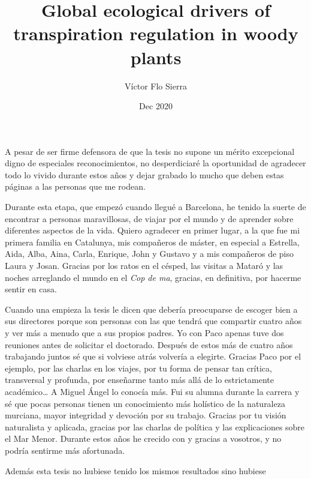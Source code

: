 \documentclass[11pt,twoside]{reedthesis}
\title{Global ecological drivers of transpiration regulation in woody plants}
\author{Víctor Flo Sierra}
\date{Dec 2020}
\begin{document}
  \maketitle

\frontmatter %
\pagestyle{empty} %
  \begin{acknowledgements}
    \setlength{\parindent}{30pt} A pesar de ser firme defensora de que la
    tesis no supone un mérito excepcional digno de especiales
    reconocimientos, no desperdiciaré la oportunidad de agradecer todo lo
    vivido durante estos años y dejar grabado lo mucho que deben estas
    páginas a las personas que me rodean.\par
    Durante esta etapa, que empezó cuando llegué a Barcelona, he tenido la
    suerte de encontrar a personas maravillosas, de viajar por el mundo y de
    aprender sobre diferentes aspectos de la vida. Quiero agradecer en
    primer lugar, a la que fue mi primera familia en Catalunya, mis
    compañeros de máster, en especial a Estrella, Aida, Alba, Aina, Carla,
    Enrique, John y Gustavo y a mis compañeros de piso Laura y Josan.
    Gracias por los ratos en el césped, las visitas a Mataró y las noches
    arreglando el mundo en el \emph{Cop de ma}, gracias, en definitiva, por
    hacerme sentir en casa.\par
    Cuando una empieza la tesis le dicen que debería preocuparse de escoger
    bien a sus directores porque son personas con las que tendrá que
    compartir cuatro años y ver más a menudo que a sus propios padres. Yo
    con Paco apenas tuve dos reuniones antes de solicitar el doctorado.
    Después de estos más de cuatro años trabajando juntos sé que si volviese
    atrás volvería a elegirte. Gracias Paco por el ejemplo, por las charlas
    en los viajes, por tu forma de pensar tan crítica, transversal y
    profunda, por enseñarme tanto más allá de lo estrictamente
    académico\ldots{} A Miguel Ángel lo conocía más. Fui su alumna durante
    la carrera y sé que pocas personas tienen un conocimiento más holístico
    de la naturaleza murciana, mayor integridad y devoción por su trabajo.
    Gracias por tu visión naturalista y aplicada, gracias por las charlas de
    política y las explicaciones sobre el Mar Menor. Durante estos años he
    crecido con y gracias a vosotros, y no podría sentirme más
    afortunada.\par
    Además esta tesis no hubiese tenido los mismos resultados sino hubiese

\end{acknowledgements}
\end{document}
